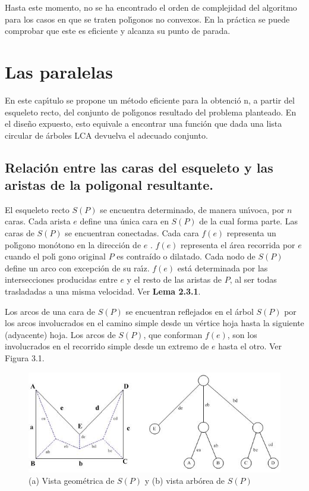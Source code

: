 \documentclass[12pt,english]{report}
\begin{document}
Hasta este momento, no se ha encontrado el orden de complejidad del
algoritmo para los casos en que se traten pol\'{\i}gonos no convexos. En la pr\'actica se puede comprobar que este es eficiente y alcanza su punto de parada. 

\chapter{Las paralelas}

En este cap\'{\i}tulo se propone un m\'{e}todo eficiente para la obtenci\'{o}%
n, a partir del esqueleto recto, del conjunto de pol\'{\i}gonos resultado
del problema planteado. En el dise\~{n}o expuesto, esto equivale a encontrar
una funci\'{o}n que dada una lista circular de \'{a}rboles LCA devuelva el
adecuado conjunto. 

\section{Relaci\'{o}n entre las caras del esqueleto y las aristas de la
poligonal resultante. }

El esqueleto recto $S(P)$ se encuentra determinado, de manera un\'{\i}voca,
por $n$ caras. Cada arista $e$ define una \'{u}nica cara en $S(P)$ de la
cual forma parte. Las caras de $S(P)$ se encuentran conectadas. Cada cara  $%
f(e)$ representa un pol\'{\i}gono mon\'{o}tono en la direcci\'{o}n de $e$
\cite{AA}. $f(e)$ representa el \'{a}rea recorrida por $e$ cuando el pol\'{\i}%
gono original $P$ es contra\'ido o dilatado. Cada nodo de $S(P)$ define un arco con excepci\'{o}n de su ra\'{\i}z. $f(e)$ est\'{a} determinada por
las intersecciones producidas entre $e$ y el resto de las aristas de $P$, al
ser todas trasladadas a una misma velocidad. Ver \textbf{Lema 2.3.1}.  

Los arcos de una cara de $S(P)$ se encuentran reflejados en el \'{a}rbol $%
S(P)$ por los arcos involucrados en el camino simple desde un v\'{e}rtice
hoja hasta la siguiente (adyacente) hoja. Los arcos de $S(P)$, que conforman  $%
f(e)$, son los involucrados en el recorrido simple desde un extremo de $e$
hasta el otro. Ver Figura 3.1.

\begin{figure}[htbp]
\begin{center}
\includegraphics{arbolp.jpg}%
\end{center}
\caption{(a) Vista geom\'etrica de $S(P)$ y (b) vista arb\'orea de $S(P)$}
\end{figure}
\end{document}
